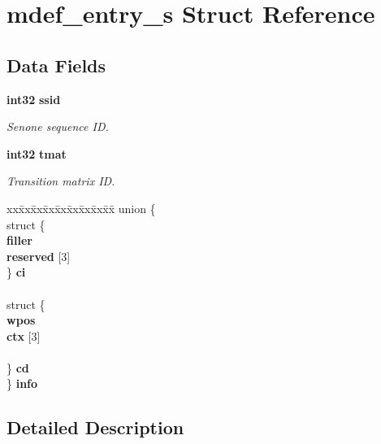 \section{mdef\-\_\-entry\-\_\-s \-Struct \-Reference}
\label{structmdef__entry__s}
\subsection*{\-Data \-Fields}
\begin{DoxyCompactItemize}
\item 
{\bf int32} {\bf ssid}\label{structmdef__entry__s_a12986649de9c59de3cc805e375b2c9a2}

\begin{DoxyCompactList}\small\item\em \-Senone sequence \-I\-D. \end{DoxyCompactList}\item 
{\bf int32} {\bf tmat}\label{structmdef__entry__s_a90758df5d6eb00d3a70135ac4475c7a1}

\begin{DoxyCompactList}\small\item\em \-Transition matrix \-I\-D. \end{DoxyCompactList}\item 
\begin{tabbing}
xx\=xx\=xx\=xx\=xx\=xx\=xx\=xx\=xx\=\kill
union \{\\
\>struct \{\\
\> {\bfseries filler}\\
\> {\bfseries reserved} [3]\\
\>\} {\bf ci}\\
\>\>\\
\>struct \{\\
\> {\bfseries wpos}\\
\> {\bf ctx} [3]\\
\>\>\\
\>\} {\bfseries cd}\\
\} {\bfseries info}\label{structmdef__entry__s_a720c96c23083115ef7f5f707652ed306}
\\

\end{tabbing}\end{DoxyCompactItemize}


\subsection{\-Detailed \-Description}


